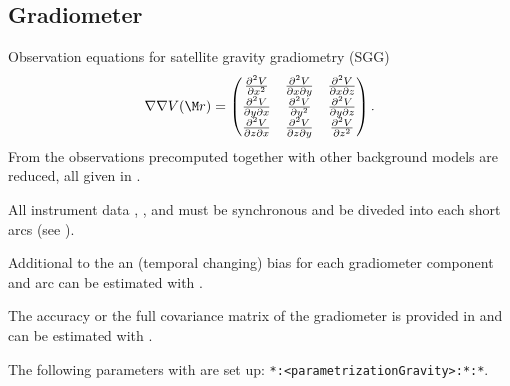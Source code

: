 \subsection{Gradiometer}\label{observationType:gradiometer}
Observation equations for satellite gravity gradiometry (SGG)
\begin{equation}
  \nabla\nabla V(\M r) =
  \begin{pmatrix}
    \frac{\partial^2 V}{\partial x^2}         & \frac{\partial^2 V}{\partial x\partial y} & \frac{\partial^2 V}{\partial x\partial z} \\
    \frac{\partial^2 V}{\partial y\partial x} & \frac{\partial^2 V}{\partial y^2}         & \frac{\partial^2 V}{\partial y\partial z} \\
    \frac{\partial^2 V}{\partial z\partial x} & \frac{\partial^2 V}{\partial z\partial y} & \frac{\partial^2 V}{\partial z^2}
  \end{pmatrix}.
\end{equation}
From the  observations precomputed 
together with other background models are reduced, all given in .

All instrument data , ,
and  must be synchronous and be diveded
into each short arcs (see ).

Additional to the 
an (temporal changing) bias for each gradiometer component and arc can be estimated with
.

The accuracy or the full covariance matrix of the gradiometer is provided in
 and can be estimated with .

The following parameters with  are set up:
\verb|*:<parametrizationGravity>:*:*|.


